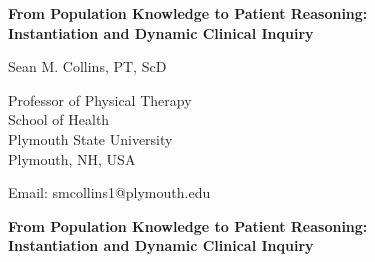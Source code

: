 \documentclass[11pt]{article}
\begin{document}

\begin{titlepage}

\thispagestyle{empty}

\begin{center}

{\Large\bfseries
From Population Knowledge to Patient Reasoning:\\[0.3em]
Instantiation and Dynamic Clinical Inquiry
}

\vspace{1.5cm}

{\large Sean M. Collins, PT, ScD}

\vspace{0.5cm}

Professor of Physical Therapy\\
School of Health\\
Plymouth State University\\
Plymouth, NH, USA

\vspace{0.5cm}

Email: smcollins1@plymouth.edu

\end{center}


\noindent


\end{titlepage}

\clearpage

\setcounter{page}{1}

\begin{center}

{\Large\bfseries
From Population Knowledge to Patient Reasoning:\\[0.3em]
Instantiation and Dynamic Clinical Inquiry
}

\vspace{1cm}


\end{center}

\vspace{0.5em}
\end{document}
